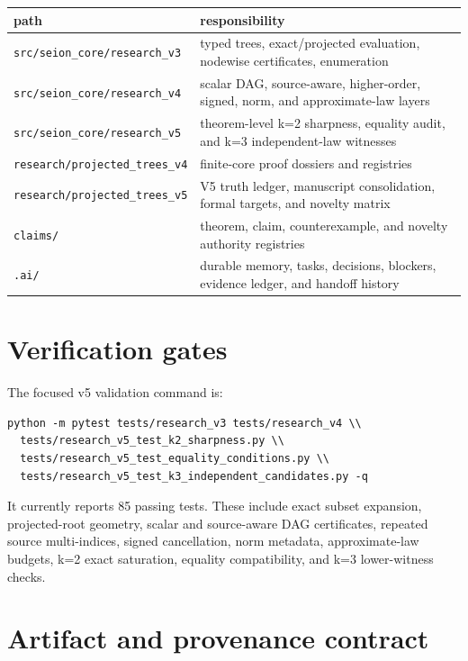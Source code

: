 \documentclass[11pt]{amsart}
\begin{document}
\begin{center}
\footnotesize
\begin{tabularx}{.97\textwidth}{@{}lX@{}}
\toprule
path & responsibility\\
\midrule
\texttt{src/seion\_core/research\_v3} & typed trees, exact/projected evaluation, nodewise certificates, enumeration\\
\texttt{src/seion\_core/research\_v4} & scalar DAG, source-aware, higher-order, signed, norm, and approximate-law layers\\
\texttt{src/seion\_core/research\_v5} & theorem-level k=2 sharpness, equality audit, and k=3 independent-law witnesses\\
\texttt{research/projected\_trees\_v4} & finite-core proof dossiers and registries\\
\texttt{research/projected\_trees\_v5} & V5 truth ledger, manuscript consolidation, formal targets, and novelty matrix\\
\texttt{claims/} & theorem, claim, counterexample, and novelty authority registries\\
\texttt{.ai/} & durable memory, tasks, decisions, blockers, evidence ledger, and handoff history\\
\bottomrule
\end{tabularx}
\end{center}

\section{Verification gates}

The focused v5 validation command is:
\begin{verbatim}
python -m pytest tests/research_v3 tests/research_v4 \\
  tests/research_v5_test_k2_sharpness.py \\
  tests/research_v5_test_equality_conditions.py \\
  tests/research_v5_test_k3_independent_candidates.py -q
\end{verbatim}
It currently reports 85 passing tests. These include exact subset expansion,
projected-root geometry, scalar and source-aware DAG certificates, repeated
source multi-indices, signed cancellation, norm metadata, approximate-law
budgets, k=2 exact saturation, equality compatibility, and k=3 lower-witness
checks.

\section{Artifact and provenance contract}
\end{document}
